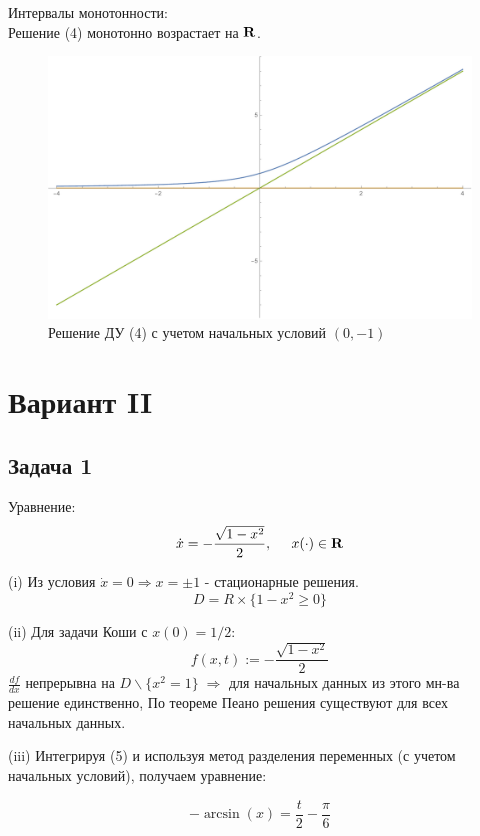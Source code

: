 \documentclass[a4paper, 12pt]{article}
\begin{document}
Интервалы монотонности:\\
Решение (4) монотонно возрастает на $\bf{R}$.

\begin{figure}[H]
	\centering
	\includegraphics[scale=0.6]{4}
	\caption{Решение ДУ (4) с учетом начальных условий $(0, -1)$}
\end{figure}




	\section{Вариант II}


		\subsection {Задача 1}


Уравнение:
\begin{equation}
\dot{x}=-\frac{\sqrt{1-x^2}}{2}, \;\;\;\;\; x( \cdot ) \in \bf{R}
\end{equation}

(i) Из условия $\dot{x}=0 \Rightarrow x=\pm 1$ - стационарные решения. 
\[D = R \times \{1-x^2\geq 0\} \]

(ii) Для задачи Коши с $x(0)=1/2$:
\[f(x, t) :=- \frac{\sqrt{1-x^2}}{2}\]
$\frac {df}{dx}$ непрерывна на $D \backslash \{x^2=1\} \; \Rightarrow $ для  начальных данных из этого мн-ва решение единственно, По теореме Пеано решения существуют для всех начальных данных.

(iii) Интегрируя (5) и используя метод разделения переменных (с учетом начальных условий), получаем уравнение: 

\begin{equation}
	-\arcsin(x) = \frac t 2 - \frac {\pi}{6}
\end{equation}
\end{document}
